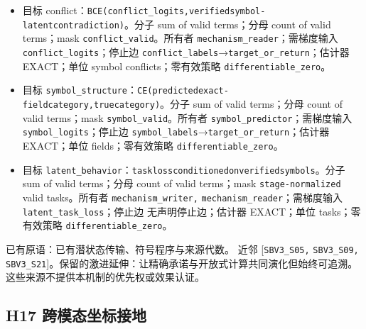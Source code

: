 \documentclass[
  10pt,
]{article}
\begin{document}
\begin{itemize}
\item
  目标
  conflict：{\small\nolinkurl{BCE(conflict_logits,verified}\hspace{0.333em}\nolinkurl{symbol-latent}\hspace{0.333em}\nolinkurl{contradiction)}}。分子
  sum of valid terms；分母 count of valid terms；mask
  \nolinkurl{conflict_valid}。所有者
  \nolinkurl{mechanism_reader}；需梯度输入
  \nolinkurl{conflict_logits}；停止边
  \nolinkurl{conflict_labels}→\nolinkurl{target_or_return}；估计器
  EXACT；单位 symbol conflicts；零有效策略
  \nolinkurl{differentiable_zero}。
\item
  目标
  \nolinkurl{symbol_structure}：{\small\nolinkurl{CE(predicted}\hspace{0.333em}\nolinkurl{exact-field}\hspace{0.333em}\nolinkurl{category,true}\hspace{0.333em}\nolinkurl{category)}}。分子
  sum of valid terms；分母 count of valid terms；mask
  \nolinkurl{symbol_valid}。所有者
  \nolinkurl{symbol_predictor}；需梯度输入
  \nolinkurl{symbol_logits}；停止边
  \nolinkurl{symbol_labels}→\nolinkurl{target_or_return}；估计器
  EXACT；单位 fields；零有效策略 \nolinkurl{differentiable_zero}。
\item
  目标
  \nolinkurl{latent_behavior}：{\small\nolinkurl{task}\hspace{0.333em}\nolinkurl{loss}\hspace{0.333em}\nolinkurl{conditioned}\hspace{0.333em}\nolinkurl{on}\hspace{0.333em}\nolinkurl{verified}\hspace{0.333em}\nolinkurl{symbols}}。分子
  sum of valid terms；分母 count of valid terms；mask
  \nolinkurl{stage-normalized} valid tasks。所有者
  \nolinkurl{mechanism_writer,} \nolinkurl{mechanism_reader}；需梯度输入
  \nolinkurl{latent_task_loss}；停止边 无声明停止边；估计器 EXACT；单位
  tasks；零有效策略 \nolinkurl{differentiable_zero}。
\end{itemize}

已有原语：已有潜状态传输、符号程序与来源代数。 近邻
{[}\nolinkurl{SBV3_S05,} \nolinkurl{SBV3_S09,}
\nolinkurl{SBV3_S21}{]}。保留的激进延伸：让精确承诺与开放式计算共同演化但始终可追溯。
这些来源不提供本机制的优先权或效果认证。

\subsection{H17
跨模态坐标接地}\label{h17-ux8de8ux6a21ux6001ux5750ux6807ux63a5ux5730}
\end{document}
